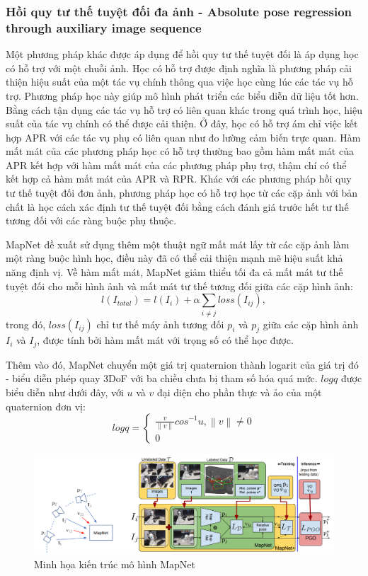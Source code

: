 \subsubsection*{Hồi quy tư thế tuyệt đối đa ảnh - Absolute pose regression through auxiliary image sequence}
Một phương pháp khác được áp dụng để hồi quy tư thế tuyệt đối là áp dụng học có hỗ trợ với một chuỗi ảnh. Học có hỗ trợ được định nghĩa là phương pháp cải thiện hiệu suất của một tác vụ chính thông qua việc học cùng lúc các tác vụ hỗ trợ. Phương pháp học này giúp mô hình phát triển các biểu diễn dữ liệu tốt hơn. Bằng cách tận dụng các tác vụ hỗ trợ có liên quan khác trong quá trình học, hiệu suất của tác vụ chính có thể được cải thiện. Ở đây, học có hỗ trợ ám chỉ việc kết hợp APR với các tác vụ phụ có liên quan như đo lường cảm biến trực quan. Hàm mất mát của các phương pháp học có hỗ trợ thường bao gồm hàm mất mát của APR kết hợp với hàm mất mát của các phương pháp phụ trợ, thậm chí có thể kết hợp cả hàm mất mát của APR và RPR. Khác với các phương pháp hồi quy tư thế tuyệt đối đơn ảnh, phương pháp học có hỗ trợ học từ các cặp ảnh với bản chất là học cách xác định tư thế tuyệt đối bằng cách đánh giá trước hết tư thế tương đối với các ràng buộc phụ thuộc.

MapNet \cite{brahmbhatt2018geometryaware} đề xuất sử dụng thêm một thuật ngữ mất mát lấy từ các cặp ảnh làm một ràng buộc hình học, điều này đã có thể cải thiện mạnh mẽ hiệu suất khả năng định vị. Về hàm mất mát, MapNet giảm thiểu tối đa cả mất mát tư thế tuyệt đối cho mỗi hình ảnh và mất mát tư thế tương đối giữa các cặp hình ảnh:
\begin{equation}
    l(I_{total}) = l(I_i) + \alpha\sum_{i\neq j}loss(I_{ij} ),
\end{equation}
trong đó, $loss(I_{ij} )$ chỉ tư thế máy ảnh tương đối $p_i$ và $p_j$ giữa các cặp hình ảnh $I_i$ và $I_j$, được tính bởi hàm mất mát với trọng số có thể học được.

Thêm vào đó, MapNet chuyển một giá trị quaternion thành logarit của giá trị đó - biểu diễn phép quay 3DoF với ba chiều chưa bị tham số hóa quá mức. $logq$ được biểu diễn như dưới đây, với $u$ và $v$ đại diện cho phần thực và ảo của một quaternion đơn vị:
\begin{equation}
    logq =
    \begin{cases}
        \frac{v}{\left \| v \right \|}cos^{-1}u, \left \| v \right \| \neq 0 \\
        0
    \end{cases}
\end{equation}
\begin{figure}[H]
    \centering
    \includegraphics[width=\textwidth]{pics/Chapter2/mapnet.png}
    \caption{Minh họa kiến trúc mô hình MapNet \cite{brahmbhatt2018geometryaware}}
\end{figure}

